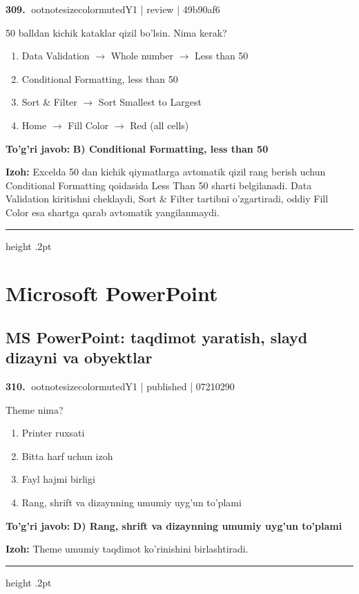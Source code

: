 \documentclass[10pt,a4paper]{article}
\begin{document}
\textbf{\color{ink}309.} {ootnotesizecolor{muted}Y1 | review | 49b90af6}
\par
50 balldan kichik kataklar qizil bo'lsin. Nima kerak?
\begin{enumerate}[label=\Alph*),leftmargin=9mm]
\item Data Validation \ensuremath{\rightarrow} Whole number \ensuremath{\rightarrow} Less than 50
\item Conditional Formatting, less than 50
\item Sort \& Filter \ensuremath{\rightarrow} Sort Smallest to Largest
\item Home \ensuremath{\rightarrow} Fill Color \ensuremath{\rightarrow} Red (all cells)
\end{enumerate}
\begin{tcolorbox}[enhanced,breakable,colback=teal!4,colframe=teal!55!black,boxrule=0.45pt,arc=1.2mm,left=2.8mm,right=2.8mm,top=2mm,bottom=2mm]
\textbf{\color{teal}To'g'ri javob:} \textbf{B) Conditional Formatting, less than 50}
\par\smallskip
\textbf{Izoh:} Excelda 50 dan kichik qiymatlarga avtomatik qizil rang berish uchun Conditional Formatting qoidasida Less Than 50 sharti belgilanadi. Data Validation kiritishni cheklaydi, Sort \& Filter tartibni o'zgartiradi, oddiy Fill Color esa shartga qarab avtomatik yangilanmaydi.
\end{tcolorbox}
\vspace{2mm}\hrule height .2pt\vspace{2mm}
\section{Microsoft PowerPoint}
\subsection{MS PowerPoint: taqdimot yaratish, slayd dizayni va obyektlar}

\textbf{\color{ink}310.} {ootnotesizecolor{muted}Y1 | published | 07210290}
\par
Theme nima?
\begin{enumerate}[label=\Alph*),leftmargin=9mm]
\item Printer ruxsati
\item Bitta harf uchun izoh
\item Fayl hajmi birligi
\item Rang, shrift va dizaynning umumiy uyg'un to'plami
\end{enumerate}
\begin{tcolorbox}[enhanced,breakable,colback=teal!4,colframe=teal!55!black,boxrule=0.45pt,arc=1.2mm,left=2.8mm,right=2.8mm,top=2mm,bottom=2mm]
\textbf{\color{teal}To'g'ri javob:} \textbf{D) Rang, shrift va dizaynning umumiy uyg'un to'plami}
\par\smallskip
\textbf{Izoh:} Theme umumiy taqdimot ko'rinishini birlashtiradi.
\end{tcolorbox}
\vspace{2mm}\hrule height .2pt\vspace{2mm}
\end{document}

